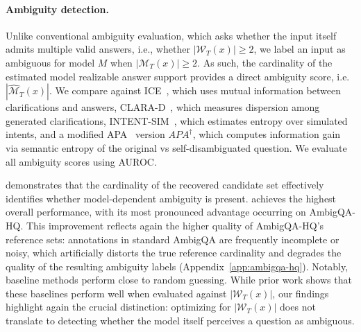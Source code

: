 \paragraph{Ambiguity detection.}
 Unlike conventional ambiguity evaluation, which asks whether the input itself admits multiple valid answers, i.e., whether $|\mathcal{W}_T(x)| \geq 2$, we label an input as ambiguous for model $M$ when $|\mathcal{M}_T(x)| \geq 2$. As such, the cardinality of the estimated model realizable answer support provides a direct ambiguity score, i.e. $|\widehat{\mathcal{M}}_T(x)|$. We compare against ICE~\citep{pmlr-v235-hou24b}, which uses mutual information between clarifications and answers, CLARA-D~\citep{rosseeuw2025clara}, which measures dispersion among generated clarifications, INTENT-SIM~\citep{zhang-choi-2025-clarify}, which estimates entropy over simulated intents, and a modified APA~\citep{kim-etal-2024-aligning} version \(APA^\dagger\), which computes information gain via semantic entropy of the original vs self-disambiguated question. We evaluate all ambiguity scores using AUROC.


 demonstrates that the cardinality of the recovered candidate set effectively identifies whether model-dependent ambiguity is present. \circleclar{} achieves the highest overall performance, with its most pronounced advantage occurring on AmbigQA-HQ. This improvement reflects again the higher quality of AmbigQA-HQ's reference sets: annotations in standard AmbigQA are frequently incomplete or noisy, which artificially distorts the true reference cardinality and degrades the quality of the resulting ambiguity labels (Appendix~\ref{app:ambigqa-hq}). Notably, baseline methods perform close to random guessing. While prior work shows that these baselines perform well when evaluated against $|\mathcal{W}_T(x)|$, our findings highlight again the crucial distinction: optimizing for $|\mathcal{W}_T(x)|$ does not translate to detecting whether the model itself perceives a question as ambiguous.


